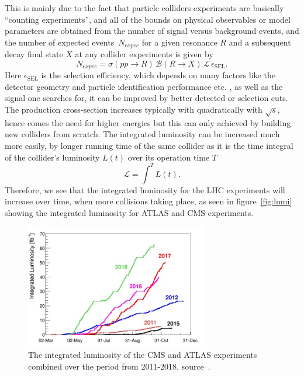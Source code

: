 This is mainly due to the fact that particle colliders experiments are basically ``counting experiments'', and all of the bounds on physical observables or model parameters are obtained from the number of signal versus background events, and the number of expected events~$N_{expec}$ for a given resonance $R$ and a subsequent decay final state $X$ at any collider experiments is given by
\begin{equation}
	N_{expec} = \sigma(pp\to R) \, \mathcal B(R \to X)\,\mathscr{L}  \, \epsilon_{\mathrm{SEL}}.
	\label{nevents}
\end{equation}
Here $ \epsilon_{\mathrm{SEL}}$ is the selection efficiency, which depends on many factors like the detector geometry and particle identification performance etc. , as well as the signal one searches for, it can be improved by better detected or selection cuts. The production cross-section increases typically with quadratically with $\sqrt {s}$, hence comes the need for higher energies but this can only achieved by building new colliders from scratch. The integrated luminosity can be increased much more easily, by longer running time of the same collider as it is the time integral of the collider's luminosity $L(t)$ over its operation time $T$
\begin{equation}
\mathscr{L} = \int^{T} L(t) .
\end{equation}
Therefore, we see that the integrated luminosity for the LHC experiments will increase over time, when more collisions taking place, as seen in figure~\autoref{fig:lumi} showing the integrated luminosity for ATLAS and CMS experiments. 
\begin{figure}[t!]
	\begin{center}
		\includegraphics[width=8cm]{figures/lhc_lumi}
		\caption{The integrated luminosity of the CMS and ATLAS experiments combined over the period from 2011-2018, source~\cite{lhcpreformance}.  \label{fig:lumi} }
	\end{center}
\end{figure}
